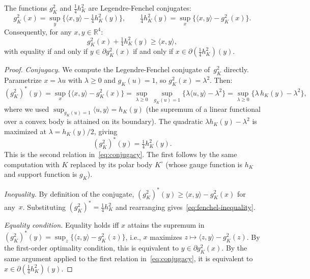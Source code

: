 \begin{lemma}\label{lem:fenchel-duality}
The functions $g_K^2$ and $\tfrac{1}{4}h_K^2$ are Legendre-Fenchel conjugates:
\begin{equation}\label{eq:conjugacy}
  g_K^2(x) = \sup_y \bigl\{\langle x, y \rangle - \tfrac{1}{4} h_K^2(y)\bigr\},
  \qquad
  \tfrac{1}{4}h_K^2(y) = \sup_x \bigl\{\langle x, y \rangle - g_K^2(x)\bigr\}.
\end{equation}
Consequently, for any $x, y \in \mathbb{R}^4$:
\begin{equation}\label{eq:fenchel-inequality}
  g_K^2(x) + \tfrac{1}{4} h_K^2(y) \geq \langle x, y \rangle,
\end{equation}
with equality if and only if
$y \in \partial g_K^2(x)$ if and only if
$x \in \partial(\tfrac{1}{4} h_K^2)(y)$.
\end{lemma}

\begin{proof}
\emph{Conjugacy.}
We compute the Legendre-Fenchel conjugate of~$g_K^2$ directly.
Parametrize $x = \lambda u$ with $\lambda \geq 0$ and $g_K(u) = 1$,
so $g_K^2(x) = \lambda^2$.
Then:
\[
  (g_K^2)^*(y)
  = \sup_x \bigl\{\langle x, y \rangle - g_K^2(x)\bigr\}
  = \sup_{\lambda \geq 0}\;
    \sup_{g_K(u) = 1}
    \bigl\{\lambda \langle u, y \rangle - \lambda^2\bigr\}
  = \sup_{\lambda \geq 0}
    \bigl\{\lambda\, h_K(y) - \lambda^2\bigr\},
\]
where we used $\sup_{g_K(u) = 1} \langle u, y \rangle = h_K(y)$
(the supremum of a linear functional over a convex body
is attained on its boundary).
The quadratic $\lambda h_K(y) - \lambda^2$ is maximized
at $\lambda = h_K(y)/2$, giving
\[
  (g_K^2)^*(y) = \tfrac{1}{4} h_K^2(y).
\]
This is the second relation in~\eqref{eq:conjugacy}.
The first follows by the same computation with $K$ replaced by its
polar body $K^\circ$ (whose gauge function is $h_K$ and
support function is $g_K$).

\emph{Inequality.}
By definition of the conjugate,
$(g_K^2)^*(y) \geq \langle x, y \rangle - g_K^2(x)$ for any~$x$.
Substituting $(g_K^2)^* = \tfrac{1}{4}h_K^2$ and rearranging
gives~\eqref{eq:fenchel-inequality}.

\emph{Equality condition.}
Equality holds iff $x$ attains the supremum in $(g_K^2)^*(y) = \sup_z \{\langle z, y \rangle - g_K^2(z)\}$,
i.e., $x$ maximizes $z \mapsto \langle z, y \rangle - g_K^2(z)$.
By the first-order optimality condition, this is equivalent to
$y \in \partial g_K^2(x)$.
By the same argument applied to the first relation in~\eqref{eq:conjugacy},
it is equivalent to $x \in \partial(\tfrac{1}{4}h_K^2)(y)$.
\end{proof}

